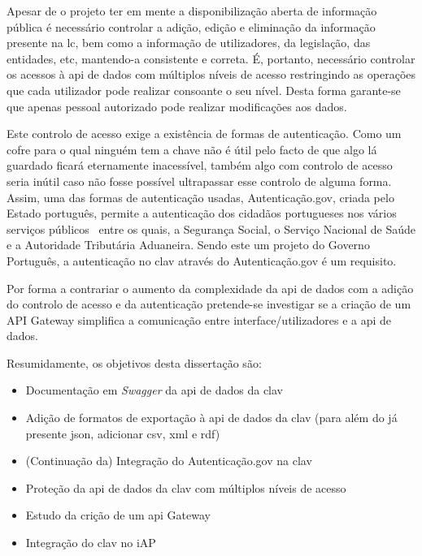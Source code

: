 Apesar de o projeto ter em mente a disponibilização aberta de informação pública é necessário controlar a adição, edição e eliminação da informação presente na \acrlong{lc}, bem como a informação de utilizadores, da legislação, das entidades, etc, mantendo-a consistente e correta. É, portanto, necessário controlar os acessos à \acrshort{api} de dados com múltiplos níveis de acesso restringindo as operações que cada utilizador pode realizar consoante o seu nível. Desta forma garante-se que apenas pessoal autorizado pode realizar modificações aos dados.

Este controlo de acesso exige a existência de formas de autenticação. Como um cofre para o qual ninguém tem a chave não é útil pelo facto de que algo lá guardado ficará eternamente inacessível, também algo com controlo de acesso seria inútil caso não fosse possível ultrapassar esse controlo de alguma forma. Assim, uma das formas de autenticação usadas, Autenticação.gov, criada pelo Estado português, permite a autenticação dos cidadãos portugueses nos vários serviços públicos~\cite{authgov} entre os quais, a Segurança Social, o Serviço Nacional de Saúde e a Autoridade Tributária Aduaneira. Sendo este um projeto do Governo Português, a autenticação no \acrshort{clav} através do Autenticação.gov é um requisito.

Por forma a contrariar o aumento da complexidade da \acrshort{api} de dados com a adição do controlo de acesso e da autenticação pretende-se investigar se a criação de um API Gateway simplifica a comunicação entre interface/utilizadores e a \acrshort{api} de dados.

Resumidamente, os objetivos desta dissertação são:

\begin{itemize}
    \item Documentação em \textit{Swagger} da \acrshort{api} de dados da \acrshort{clav}
    \item Adição de formatos de exportação à \acrshort{api} de dados da \acrshort{clav} (para além do já presente \acrshort{json}, adicionar \acrshort{csv}, \acrshort{xml} e \acrshort{rdf})
    \item (Continuação da) Integração do Autenticação.gov na \acrshort{clav}
    \item Proteção da \acrshort{api} de dados da \acrshort{clav} com múltiplos níveis de acesso
    \item Estudo da crição de um \acrshort{api} Gateway
    \item Integração do \acrshort{clav} no iAP
\end{itemize}

